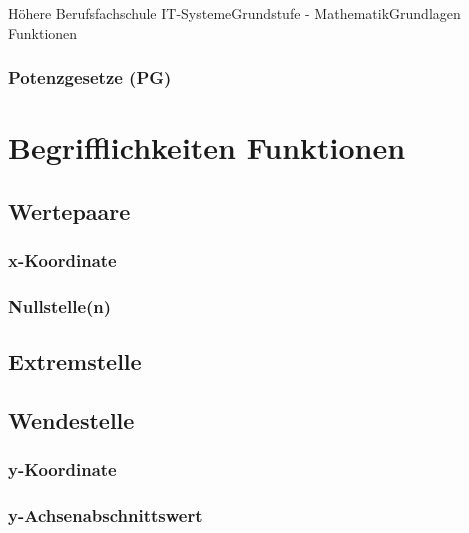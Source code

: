 \documentclass[11pt,twocolumn,oneside,openany,headings=optiontotoc,11pt,numbers=noenddot]{article}
\begin{document}
\begin{worksheet}{Höhere Berufsfachschule IT-Systeme}{Grundstufe - Mathematik}{Grundlagen Funktionen}
		\subsubsection*{Potenzgesetze (PG)}
		\section{Begrifflichkeiten Funktionen}
		\subsection{Wertepaare}
		\subsubsection{x-Koordinate}
		\subsubsection*{Nullstelle(n)}
		\subsection*{Extremstelle}
		\subsection*{Wendestelle}
		\subsubsection{y-Koordinate}
		\subsubsection*{y-Achsenabschnittswert}
	\end{worksheet}
\end{document}
